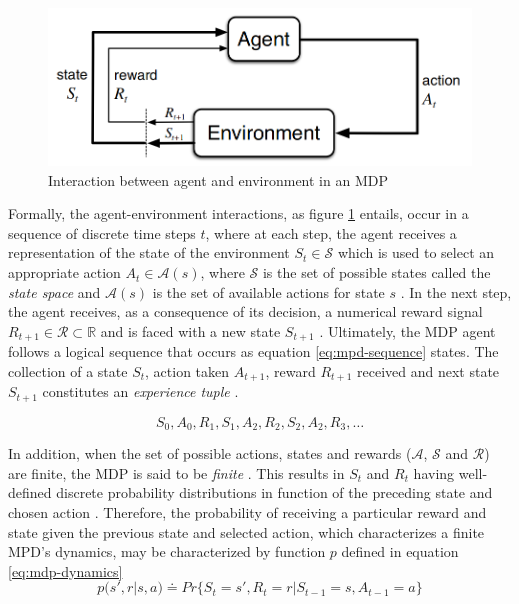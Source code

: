 \begin{figure}
	\centering
	\includegraphics[width=0.75\linewidth]{./figures/mpd.png}
	\caption{Interaction between agent and environment in an \ac{MDP} \cite{suttonReinforcementLearningIntroduction2014}}
	\label{fig:mpd-interaction}
\end{figure}

Formally, the agent-environment interactions, as figure \ref{fig:mpd-interaction} entails, occur in a sequence of discrete time steps $t$, where at each step, the agent receives a representation of the state of the environment $S_t \in \mathcal{S}$ which is used to select an appropriate action $A_t \in \mathcal{A}(s)$, where $\mathcal{S}$ is the set of possible states called the \textit{state space} and $\mathcal{A}(s)$ is the set of available actions for state $s$ \cite{suttonReinforcementLearningIntroduction2014, moralesGrokkingDeepReinforcement2020}. In the next step, the agent receives, as a consequence of its decision, a numerical reward signal $R_{t+1} \in \mathcal{R} \subset \mathbb{R}$ and is faced with a new state $S_{t +1}$ \cite{suttonReinforcementLearningIntroduction2014}. Ultimately, the MDP agent follows a logical sequence that occurs as equation \ref{eq:mpd-sequence} states. The collection of a state $S_t$, action taken $A_{t+1}$, reward $R_{t+1}$ received and next state $S_{t+1}$ constitutes an \textit{experience tuple} \cite{moralesGrokkingDeepReinforcement2020}.

\begin{equation} \label{eq:mpd-sequence}
	S_0, A_0, R_1, S_1, A_2, R_2, S_2, A_2, R_3, \dots
\end{equation}

In addition, when the set of possible actions, states and rewards ($\mathcal{A}$, $\mathcal{S}$ and $\mathcal{R}$) are finite, the \ac{MDP} is said to be \textit{finite} \cite{suttonReinforcementLearningIntroduction2014}. This results in $S_t$ and $R_t$ having well-defined discrete probability distributions in function of the preceding state and chosen action \cite{suttonReinforcementLearningIntroduction2014}. Therefore, the probability of receiving a particular reward and state given the previous state and selected action, which characterizes a finite MPD's dynamics, may be characterized by function $p$ defined in equation \ref{eq:mdp-dynamics}
\begin{equation} \label{eq:mdp-dynamics}
	p(s',r|s,a) \doteq Pr\{S_t = s', R_t = r | S_{t-1} = s, A_{t-1} = a\}
\end{equation}

